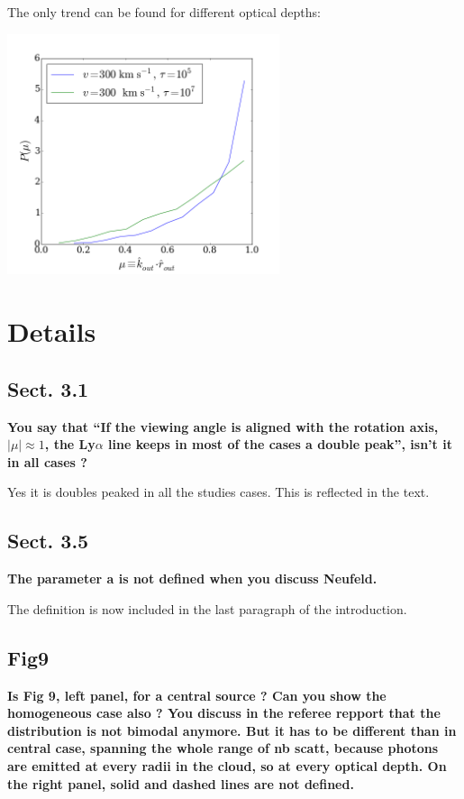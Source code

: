 \documentclass[12pt]{article}
\begin{document}
The only trend can be found for different optical depths:

\begin{center}
\includegraphics[width=0.6\textwidth]{./surface_mu_diff_tau.png}
\end{center}

\section*{Details}

\subsection*{Sect. 3.1}

{\bf You say that “If the viewing angle is aligned with the rotation
  axis, $|\mu| \approx 1$, the Ly$\alpha$ line keeps in most of the
  cases a double peak”, isn’t it in all cases ?} 
  
  Yes it is doubles peaked in all the studies cases. This is reflected
  in the text.

\subsection*{Sect. 3.5}
{\bf The parameter a is not defined when you discuss Neufeld.} 

The definition is now included in the last paragraph of the
introduction. 

\subsection*{Fig9}

{\bf Is Fig 9, left panel, for a central source ? Can you show the
  homogeneous case also ? You discuss in the referee repport that the
  distribution is not bimodal anymore. But it has to be different than
  in central case, spanning the whole range of nb scatt, because
  photons are emitted at every radii in the cloud, so at every optical
  depth. On the right panel, solid and dashed lines are not defined.}
 
\end{document}
